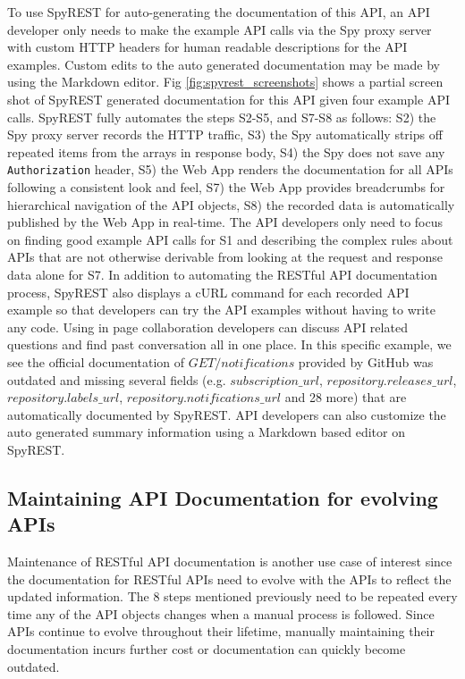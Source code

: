 \documentclass[conference]{IEEEtran}
\begin{document}
To use SpyREST for auto-generating the documentation of this API, an API developer only needs to make the example API calls via the Spy proxy server with custom HTTP headers for human readable descriptions for the API examples. Custom edits to the auto generated documentation may be made by using the Markdown editor. Fig \ref{fig:spyrest_screenshots} shows a partial screen shot of SpyREST generated documentation for this API given four example API calls. SpyREST fully automates the steps S2-S5, and S7-S8 as follows: S2) the Spy proxy server records the HTTP traffic, S3) the Spy automatically strips off repeated items from the arrays in response body, S4) the Spy does not save any \texttt{Authorization} header, S5) the Web App renders the documentation for all APIs following a consistent look and feel, S7) the Web App provides breadcrumbs for hierarchical navigation of the API objects, S8) the recorded data is automatically published by the Web App in real-time. The API developers only need to focus on finding good example API calls for S1 and describing the complex rules about APIs that are not otherwise derivable from looking at the request and response data alone for S7. In addition to automating the RESTful API documentation process, SpyREST also displays a cURL command for each recorded API example so that developers can try the API examples without having to write any code. Using in page collaboration developers can discuss API related questions and find past conversation all in one place. In this specific example, we see the official documentation of $GET /notifications$ provided by GitHub was outdated and missing several fields (e.g. $subscription\_url$, $repository.releases\_url$, $repository.labels\_url$, $repository.notifications\_url$ and 28 more) that are automatically documented by SpyREST. API developers can also customize the auto generated summary information using a Markdown based editor on SpyREST.

\subsection{Maintaining API Documentation for evolving APIs} %
Maintenance of RESTful API documentation is another use case of interest since the documentation for RESTful APIs need to evolve with the APIs to reflect the updated information. The 8 steps mentioned previously need to be repeated every time any of the API objects changes when a manual process is followed. Since APIs continue to evolve throughout their lifetime, manually maintaining their documentation incurs further cost or documentation can quickly become outdated.
\end{document}
